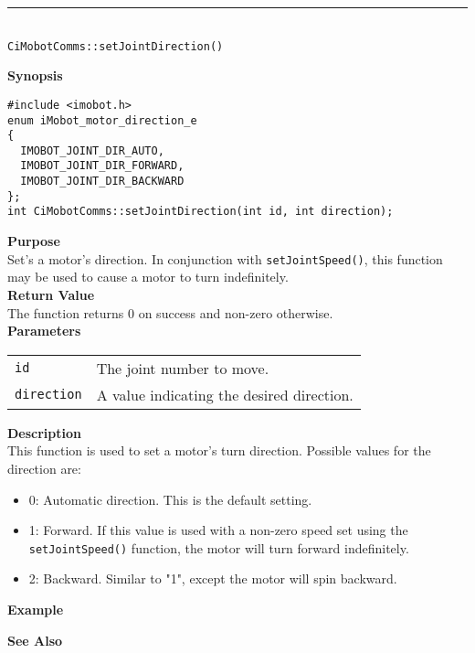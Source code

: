 \noindent
\vspace{5pt}
\rule{4.5in}{0.015in}\\
\noindent
{\LARGE \texttt{CiMobotComms::setJointDirection()}}\\
{}

\noindent
{\bf Synopsis}\\
\begin{verbatim}
#include <imobot.h>
enum iMobot_motor_direction_e
{
  IMOBOT_JOINT_DIR_AUTO,
  IMOBOT_JOINT_DIR_FORWARD,
  IMOBOT_JOINT_DIR_BACKWARD
};
int CiMobotComms::setJointDirection(int id, int direction);
\end{verbatim}

\noindent
{\bf Purpose}\\
Set's a motor's direction. In conjunction with \texttt{setJointSpeed()}, this
function may be used to cause a motor to turn indefinitely.\\

\noindent
{\bf Return Value}\\
The function returns 0 on success and non-zero otherwise.\\

\noindent
{\bf Parameters}
\vspace{-0.1in}
\begin{description}
\item               
\begin{tabular}{p{20 mm}p{145 mm}}
\texttt{id} & The joint number to move. \\
\texttt{direction} & A value indicating the desired direction.
\end{tabular}
\end{description}

\noindent
{\bf Description}\\
This function is used to set a motor's turn direction. Possible values for the
direction are:
\begin{itemize}
\item 0: Automatic direction. This is the default setting. 
\item 1: Forward. If this value is used with a non-zero speed set using the
\texttt{setJointSpeed()} function, the motor will turn forward indefinitely.
\item 2: Backward. Similar to "1", except the motor will spin backward.
\end{itemize}

\noindent
{\bf Example}\\
\noindent

\noindent
{\bf See Also}\\

